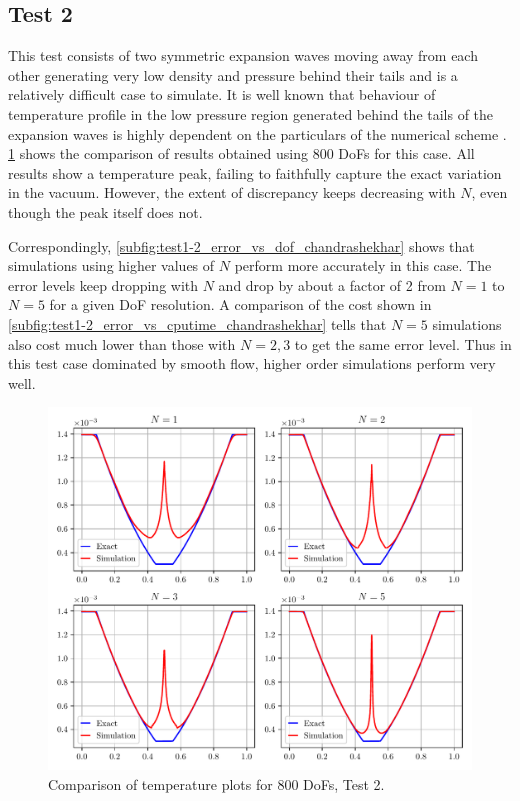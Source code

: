 \documentclass[a4paper,11pt,oneside]{article}
\begin{document}
\subsection{Test 2}
\label{subsec:test1-2}

This test consists of two symmetric expansion waves moving away from each other generating very low density and pressure behind their tails and is a relatively difficult case to simulate. It is well known that behaviour of temperature profile in the low pressure region generated behind the tails of the expansion waves is highly dependent on the particulars of the numerical scheme \cite{toro2009}. \cref{fig:test1-2_dof800_chandrashekhar} shows the comparison of results obtained using 800 DoFs for this case. All results show a temperature peak, failing to faithfully capture the exact variation in the vacuum. However, the extent of discrepancy keeps decreasing with $N$, even though the peak itself does not.

Correspondingly, \cref{subfig:test1-2_error_vs_dof_chandrashekhar} shows that simulations using higher values of $N$ perform more accurately in this case. The error levels keep dropping with $N$ and drop by about a factor of 2 from $N=1$ to $N=5$ for a given DoF resolution. A comparison of the cost shown in \cref{subfig:test1-2_error_vs_cputime_chandrashekhar} tells that $N=5$ simulations also cost much lower than those with $N=2,3$ to get the same error level. Thus in this test case dominated by smooth flow, higher order simulations perform very well.

\begin{figure}[htbp]
	\includegraphics[width=\linewidth]{figures/riemann_1d/test1-2/dof800_12_12_chandrashekhar.pdf}
	\caption{Comparison of temperature plots for 800 DoFs, Test 2.}
	\label{fig:test1-2_dof800_chandrashekhar}
\end{figure}
\end{document}
